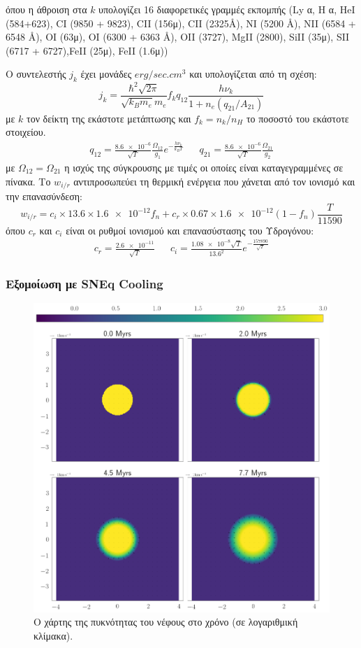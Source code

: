 \documentclass[article,a4paper,11.2pt]{memoir}
\numberwithin{equation}{subsection}
\begin{document}
	όπου η άθροιση στα $k$ υπολογίζει 16 διαφορετικές γραμμές εκπομπής 
	(Ly α, H α, HeI (584+623), CI (9850 + 9823), CII (156μ), CII (2325Å), NI (5200 Å),
	NII (6584 + 6548 Å), OI (63μ), OI (6300 + 6363 Å), OII (3727), MgII (2800), SiII (35μ), SII (6717 + 6727),FeII (25μ), FeII (1.6μ))
	
	Ο συντελεστής $j_k$ έχει μονάδες $\si{erg/sec . cm^3}$ και υπολογίζεται από τη σχέση:
	\begin{equation}
	j_k=\frac{\hbar^2 \sqrt{2\pi}}{\sqrt{k_B m_e}m_e}f_k q_{12}\frac{h \nu _k}{1+n_e (q_{21}/A_{21})}
	\end{equation}
	με $k$ τον δείκτη της εκάστοτε μετάπτωσης και $f_k=n_k/n_H$ το ποσοστό του εκάστοτε στοιχείου.
	\begin{align}
	q_{12}=\frac{\num{8.6e-6}}{\sqrt{T}}\frac{\Omega _{12}}{g_1}e^{-\frac{h\nu _k}{k_B T}} 
	&&
	q_{21}=\frac{\num{8.6e-6}}{\sqrt{T}}\frac{\Omega _{21}}{g_2}
	\end{align} 
	με $\Omega _{12} = \Omega _{21}$ η ισχύς της σύγκρουσης με τιμές οι οποίες είναι καταγεγραμμένες σε πίνακα.
	Το $w_{i/r}$ αντιπροσωπεύει τη θερμική ενέργεια που χάνεται από τον ιονισμό και την επανασύνδεση:
	\begin{equation}
	w_{i/r} = c_i\times \num{13.6}\times \num{1.6e-12} f_n +c_r \times \num{0.67}\times \num{1.6e-12} (1-f_n) \frac{T}{11590}
	\end{equation}
	όπου $c_r$ και $c_i$ είναι οι ρυθμοί ιονισμού και επανασύστασης του Υδρογόνου:
	\begin{align}
	c_r=\frac{\num{2.6e-11}}{\sqrt{T}} 
	&& 
	c_i=\frac{\num{1.08e-8}\sqrt{T}}{\num{13.6}^2} e^{-\frac{\num{157890}}{\sqrt{T}}}
	\end{align}
	
	
	\subsubsection{Εξομοίωση με SNEq Cooling}
	
	\begin{figure}[h]
		\includegraphics[width=0.7\linewidth]{DataImages/SNCoolingRHOquad}
		\caption{Ο χάρτης της πυκνότητας του νέφους στο χρόνο (σε λογαριθμική κλίμακα).}
		\label{fig:sncoolingrhoquad}
	\end{figure}
	
\end{document}
